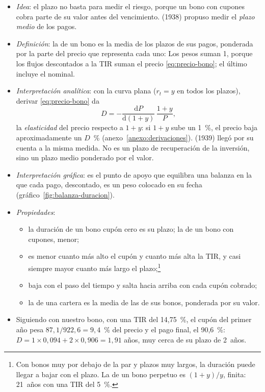 \documentclass[11pt]{article}
\begin{document}
\begin{itemize}
\item \emph{Idea}: el plazo no basta para medir el riesgo, porque un bono con cupones cobra parte de su valor antes del vencimiento.  (1938)\nocite{Macaulay1938Some} propuso medir el \emph{plazo medio} de los pagos.
\item \emph{Definición}: la  de un bono es la media de los plazos de sus pagos, ponderada por la parte del precio que representa cada uno:
  Los pesos suman 1, porque los flujos descontados a la TIR suman el precio \eqref{eq:precio-bono}; el último incluye el nominal.
\item \emph{Interpretación analítica}: con la curva plana ($r_t=y$ en todos los plazos), derivar \eqref{eq:precio-bono} da
  \[
  D=-\frac{\mathrm{d}P}{\mathrm{d}(1+y)}\,\frac{1+y}{P} ,
  \]
  la \emph{elasticidad} del precio respecto a $1+y$: si $1+y$ sube un 1~\%, el precio baja aproximadamente un $D$~\% (anexo~\ref{anexo:derivaciones}).  (1939) llegó por su cuenta a la misma medida. No es un plazo de recuperación de la inversión, sino un plazo medio ponderado por el valor.
\item \emph{Interpretación gráfica}: es el punto de apoyo que equilibra una balanza en la que cada pago, descontado, es un peso colocado en su fecha (gráfico~\ref{fig:balanza-duracion})\nocite{RodriguezGrana2014Duracion}.
\item \emph{Propiedades}:
  \begin{itemize}
  \item la duración de un bono cupón cero es su plazo; la de un bono con cupones, menor;
  \item es menor cuanto más alto el cupón y cuanto más alta la TIR, y casi siempre mayor cuanto más largo el plazo;\footnote{Con bonos muy por debajo de la par y plazos muy largos, la duración puede llegar a bajar con el plazo. La de un bono perpetuo es $(1+y)/y$, finita: 21~años con una TIR del 5~\%.}
  \item baja con el paso del tiempo y salta hacia arriba con cada cupón cobrado;
  \item la de una cartera es la media de las de sus bonos, ponderada por su valor.
  \end{itemize}
\item Siguiendo con nuestro bono, con una TIR del 14,75~\%, el cupón del primer año pesa $87{,}1/922{,}6=9{,}4$~\% del precio y el pago final, el 90,6~\%: $D=1\times0{,}094+2\times0{,}906=1{,}91$ años, muy cerca de su plazo de 2~años.
\end{itemize}
\end{document}
